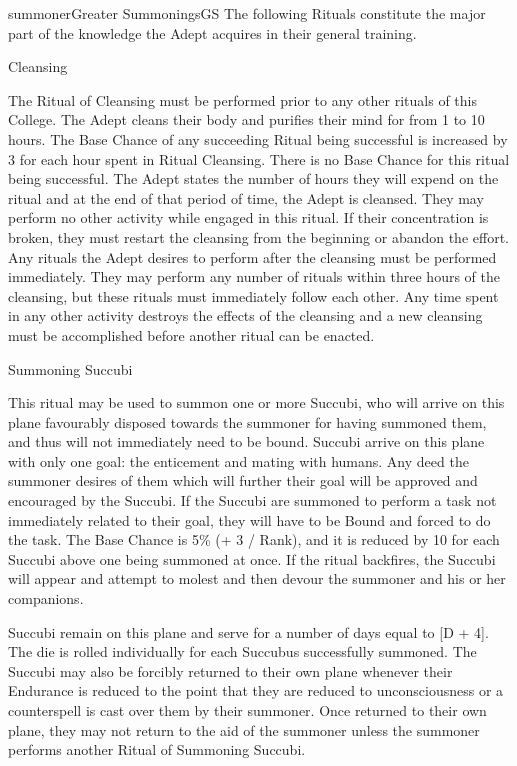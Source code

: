 \begin{college}[1.0]{summoner}{Greater Summonings}{GS}
The following Rituals constitute the major part of the knowledge the
Adept acquires in their general training.

\begin{ritual}[Q-1]{Cleansing}

\begin{effects}
The Ritual of Cleansing must be performed prior to any other rituals
of this College.  The Adept cleans their body and purifies their mind
for from 1 to 10 hours.  The Base Chance of any succeeding Ritual
being successful is increased by 3 for each hour spent in Ritual
Cleansing.  There is no Base Chance for this ritual being successful.
The Adept states the number of hours they will expend on the ritual
and at the end of that period of time, the Adept is cleansed.  They
may perform no other activity while engaged in this ritual.  If their
concentration is broken, they must restart the cleansing from the
beginning or abandon the effort.  Any rituals the Adept desires to
perform after the cleansing must be performed immediately.  They may
perform any number of rituals within three hours of the cleansing, but
these rituals must immediately follow each other.  Any time spent in
any other activity destroys the effects of the cleansing and a new
cleansing must be accomplished before another ritual can be enacted.

\end{effects}
\end{ritual}

\begin{ritual}[Q-2]{Summoning Succubi}

\begin{effects}
This ritual may be used to summon one or more Succubi, who will arrive
on this plane favourably disposed towards the summoner for having
summoned them, and thus will not immediately need to be bound.
Succubi arrive on this plane with only one goal: the enticement and
mating with humans.  Any deed the summoner desires of them which will
further their goal will be approved and encouraged by the Succubi.  If
the Succubi are summoned to perform a task not immediately related to
their goal, they will have to be Bound and forced to do the task.  The
Base Chance is 5\% (+ 3 / Rank), and it is reduced by 10 for each
Succubi above one being summoned at once.  If the ritual backfires,
the Succubi will appear and attempt to molest and then devour the
summoner and his or her companions.

Succubi remain on this plane and serve for a number of days equal to
[D + 4].  The die is rolled individually for each Succubus
successfully summoned.  The Succubi may also be forcibly returned to
their own plane whenever their Endurance is reduced to the point that
they are reduced to unconsciousness or a counterspell is cast over
them by their summoner.  Once returned to their own plane, they may
not return to the aid of the summoner unless the summoner performs
another Ritual of Summoning Succubi.
\end{effects}
\end{ritual}


\end{college}
